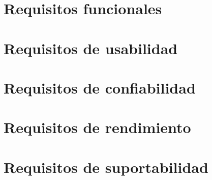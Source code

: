   \section{Requisitos funcionales}

  \section{Requisitos de usabilidad}

  \section{Requisitos de confiabilidad}

  \section{Requisitos de rendimiento}

  \section{Requisitos de suportabilidad}
